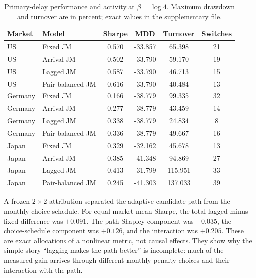 \begin{table}[t]
\centering
\caption{Primary-delay performance and activity at $\beta=\log 4$. Maximum
drawdown and turnover are in percent; exact values in the supplementary file.}
\label{tab:adaptiveperf}
\small
\begin{threeparttable}
\begin{tabular}{l l
  S[table-format=1.3]
  S[table-format=-2.3]
  S[table-format=3.3]
  S[table-format=2.0]}
\toprule
Market & Model & {Sharpe} & {MDD} & {Turnover} & {Switches} \\
\midrule
US & Fixed JM         & 0.570 & -33.857 & 65.398  & 21 \\
US & Arrival JM       & 0.502 & -33.790 & 59.170  & 19 \\
US & Lagged JM        & 0.587 & -33.790 & 46.713  & 15 \\
US & Pair-balanced JM & 0.616 & -33.790 & 40.484  & 13 \\
\addlinespace
Germany & Fixed JM         & 0.166 & -38.779 & 99.335 & 32 \\
Germany & Arrival JM       & 0.277 & -38.779 & 43.459 & 14 \\
Germany & Lagged JM        & 0.338 & -38.779 & 24.834 & 8 \\
Germany & Pair-balanced JM & 0.336 & -38.779 & 49.667 & 16 \\
\addlinespace
Japan & Fixed JM         & 0.329 & -32.162 & 45.678  & 13 \\
Japan & Arrival JM       & 0.385 & -41.348 & 94.869  & 27 \\
Japan & Lagged JM        & 0.413 & -31.799 & 115.951 & 33 \\
Japan & Pair-balanced JM & 0.245 & -41.303 & 137.033 & 39 \\
\bottomrule
\end{tabular}
\end{threeparttable}
\end{table}

A frozen $2\times2$ attribution separated the adaptive candidate path from the
monthly choice schedule. For equal-market mean Sharpe, the total
lagged-minus-fixed difference was $+0.091$. The path Shapley component was
$-0.035$, the choice-schedule component was $+0.126$, and the interaction was
$+0.205$. These are exact allocations of a nonlinear metric, not causal effects.
They show why the simple story ``lagging makes the path better'' is incomplete:
much of the measured gain arrives through different monthly penalty choices and
their interaction with the path.

